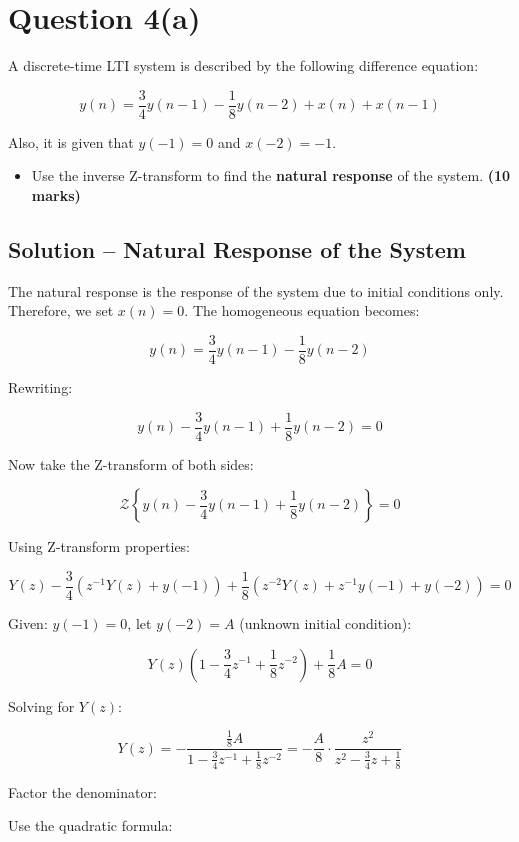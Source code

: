 \documentclass[12pt]{article}
\begin{document}
	
	\section*{Question 4(a)}
	
	A discrete-time LTI system is described by the following difference equation:
	
	\[
	y(n) = \frac{3}{4}y(n-1) - \frac{1}{8}y(n-2) + x(n) + x(n-1)
	\]
	
	Also, it is given that \( y(-1) = 0 \) and \( x(-2) = -1 \).
	
	\begin{itemize}
		\item Use the inverse Z-transform to find the \textbf{natural response} of the system. \textbf{(10 marks)}
	\end{itemize}
	
	\subsection*{Solution – Natural Response of the System}
	
	The natural response is the response of the system due to initial conditions only. Therefore, we set \( x(n) = 0 \). The homogeneous equation becomes:
	
	\[
	y(n) = \frac{3}{4}y(n-1) - \frac{1}{8}y(n-2)
	\]
	
	Rewriting:
	
	\[
	y(n) - \frac{3}{4}y(n-1) + \frac{1}{8}y(n-2) = 0
	\]
	
	Now take the Z-transform of both sides:
	
	\[
	\mathcal{Z}\left\{y(n) - \frac{3}{4}y(n-1) + \frac{1}{8}y(n-2)\right\} = 0
	\]
	
	Using Z-transform properties:
	
	\[
	Y(z) - \frac{3}{4}(z^{-1}Y(z) + y(-1)) + \frac{1}{8}(z^{-2}Y(z) + z^{-1}y(-1) + y(-2)) = 0
	\]
	
	Given: \( y(-1) = 0 \), let \( y(-2) = A \) (unknown initial condition):
	
	\[
	Y(z)\left(1 - \frac{3}{4}z^{-1} + \frac{1}{8}z^{-2}\right) + \frac{1}{8}A = 0
	\]
	
	Solving for \( Y(z) \):
	
	\[
	Y(z) = -\frac{\frac{1}{8}A}{1 - \frac{3}{4}z^{-1} + \frac{1}{8}z^{-2}} = -\frac{A}{8} \cdot \frac{z^2}{z^2 - \frac{3}{4}z + \frac{1}{8}}
	\]
	
	Factor the denominator:
	
	Use the quadratic formula:
	
\end{document}
